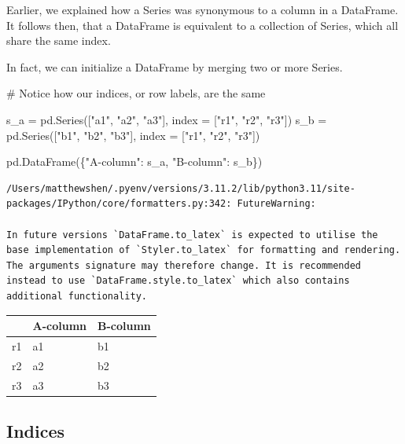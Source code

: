 \documentclass[
  letterpaper,
  DIV=11,
  numbers=noendperiod]{scrreprt}
\newenvironment{Shaded}{\begin{snugshade}}{\end{snugshade}}
\newcommand{\CommentTok}[1]{\textcolor[rgb]{0.37,0.37,0.37}{#1}}
\newcommand{\NormalTok}[1]{\textcolor[rgb]{0.00,0.23,0.31}{#1}}
\newcommand{\OperatorTok}[1]{\textcolor[rgb]{0.37,0.37,0.37}{#1}}
\newcommand{\StringTok}[1]{\textcolor[rgb]{0.13,0.47,0.30}{#1}}
\begin{document}
Earlier, we explained how a Series was synonymous to a column in a
DataFrame. It follows then, that a DataFrame is equivalent to a
collection of Series, which all share the same index.

In fact, we can initialize a DataFrame by merging two or more Series.

\begin{Shaded}
\begin{Highlighting}[]
\CommentTok{\# Notice how our indices, or row labels, are the same}

\NormalTok{s\_a }\OperatorTok{=}\NormalTok{ pd.Series([}\StringTok{"a1"}\NormalTok{, }\StringTok{"a2"}\NormalTok{, }\StringTok{"a3"}\NormalTok{], index }\OperatorTok{=}\NormalTok{ [}\StringTok{"r1"}\NormalTok{, }\StringTok{"r2"}\NormalTok{, }\StringTok{"r3"}\NormalTok{])}
\NormalTok{s\_b }\OperatorTok{=}\NormalTok{ pd.Series([}\StringTok{"b1"}\NormalTok{, }\StringTok{"b2"}\NormalTok{, }\StringTok{"b3"}\NormalTok{], index }\OperatorTok{=}\NormalTok{ [}\StringTok{"r1"}\NormalTok{, }\StringTok{"r2"}\NormalTok{, }\StringTok{"r3"}\NormalTok{])}

\NormalTok{pd.DataFrame(\{}\StringTok{"A{-}column"}\NormalTok{: s\_a, }\StringTok{"B{-}column"}\NormalTok{: s\_b\})}
\end{Highlighting}
\end{Shaded}

\begin{verbatim}
/Users/matthewshen/.pyenv/versions/3.11.2/lib/python3.11/site-packages/IPython/core/formatters.py:342: FutureWarning:

In future versions `DataFrame.to_latex` is expected to utilise the base implementation of `Styler.to_latex` for formatting and rendering. The arguments signature may therefore change. It is recommended instead to use `DataFrame.style.to_latex` which also contains additional functionality.
\end{verbatim}

\begin{tabular}{lll}
\toprule
{} & A-column & B-column \\
\midrule
r1 &       a1 &       b1 \\
r2 &       a2 &       b2 \\
r3 &       a3 &       b3 \\
\bottomrule
\end{tabular}

\hypertarget{indices}{%
\subsection{Indices}\label{indices}}
\end{document}
